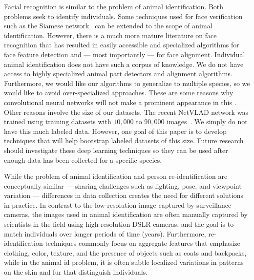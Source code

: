         Facial recognition is similar to the problem of animal identification.
        Both problems seek to identify individuals. Some techniques used for face verification such as the Siamese
        network~\cite{chopra_learning_2005, taigman_deepface_2014} can be extended to the scope of animal
        identification. However, there is a much more mature literature on face recognition that has resulted in
        easily accessible and specialized algorithms for face feature detection and --- most importantly --- for
        face alignment. Individual animal identification does not have such a corpus of knowledge. We do not have
        access to highly specialized animal part detectors and alignment algorithms. Furthermore, we would like our
        algorithms to generalize to multiple species, so we would like to avoid over-specialized approaches. These
        are some reasons why convolutional neural networks will not make a prominent appearance in this \thesis{}.
        Other reasons involve the size of our datasets. The recent NetVLAD network was trained using training
        datasets with $10,000$ to $90,000$ images~\cite{arandjelovic_netvlad_2016}. We simply do not have this much
        labeled data. However, one goal of this paper is to develop techniques that will help bootstrap labeled
        datasets of this size. Future research should investigate these deep learning techniques so they can be
        used after enough data has been collected for a specific species.

        While the problem of animal identification and person re-identification are conceptually similar ---
        sharing challenges such as lighting, pose, and viewpoint variation --- differences in data collection
        creates the need for different solutions in practice. In contrast to the low-resolution image captured by
        surveillance cameras, the images used in animal identification are often manually captured by scientists in
        the field using high resolution DSLR cameras, and the goal is to match individuals over longer periods of
        time (years). Furthermore, re-identification techniques commonly focus on aggregate features that emphasize
        clothing, color, texture, and the presence of objects such as coats and backpacks, while in the animal id
        problem, it is often subtle localized variations in patterns on the skin and fur that distinguish
        individuals.



